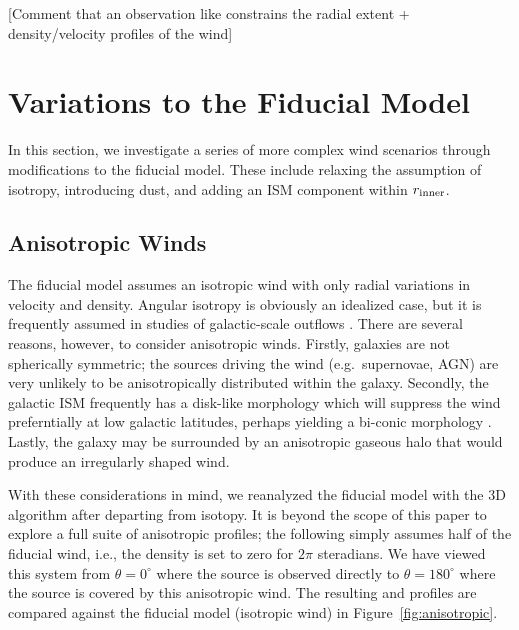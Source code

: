 \documentclass[12pt,preprint]{aastex}
\begin{document}
[Comment that an observation like constrains the radial extent +
density/velocity profiles of the wind]


\section{Variations to the Fiducial Model}

In this section, we investigate a series of more complex wind
scenarios
through modifications to the fiducial model.  These include relaxing
the assumption of isotropy, introducing dust, and adding an ISM
component within $r_{\rm inner}$.

\subsection{Anisotropic Winds}
\label{sec:anisotropic}

The fiducial model assumes an
isotropic wind with only radial variations in velocity and density. 
Angular isotropy is obviously an idealized case, but
it is frequently assumed in studies of galactic-scale outflows
\citep[e.g.][]{steidel+10}.   There are several reasons, however, to
consider anisotropic winds.  Firstly, galaxies are not spherically
symmetric;  the sources driving the
wind (e.g.\ supernovae, AGN) are very unlikely to be anisotropically distributed
within the galaxy.  
Secondly, the galactic ISM frequently has a disk-like morphology
which will suppress the wind preferntially at low galactic latitudes,
perhaps yielding a bi-conic morphology \citep[e.g.][]{M87}.
Lastly, the galaxy may be surrounded by an
anisotropic gaseous halo that would produce an irregularly shaped
wind.

With these considerations in mind, we reanalyzed the fiducial model
with the 3D algorithm after departing from isotopy.  It is beyond the
scope of this paper to explore a full suite of anisotropic profiles;
the following simply assumes half of the fiducial wind, i.e.,  
the density is set to zero for $2\pi$ steradians.
We have viewed this system from $\theta = 0^\circ$ where
the source is observed directly to $\theta = 180^\circ$ where the source
is covered by this anisotropic wind.  The resulting  and
 profiles are compared against the fiducial model
(isotropic wind) in Figure~\ref{fig:anisotropic}.  
\end{document}
